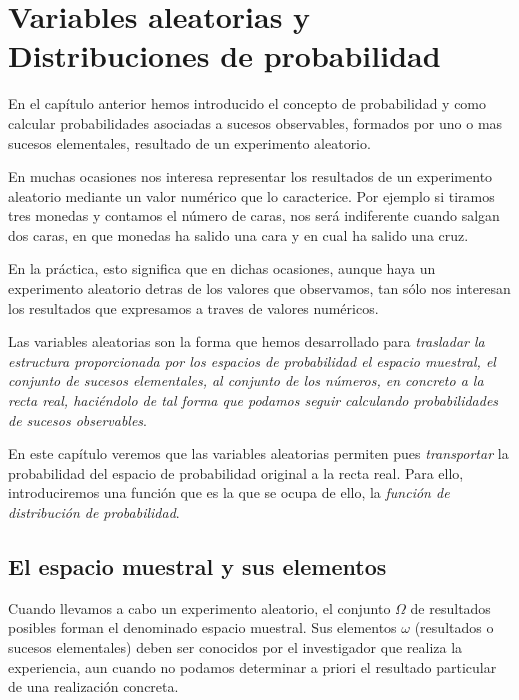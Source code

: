 \documentclass[
]{article}
\begin{document}
\newpage

\section{Variables aleatorias y Distribuciones de probabilidad}\label{variables-aleatorias-y-distribuciones-de-probabilidad}

En el capítulo anterior hemos introducido el concepto de probabilidad y
como calcular probabilidades asociadas a sucesos observables, formados
por uno o mas sucesos elementales, resultado de un experimento
aleatorio.

En muchas ocasiones nos interesa representar los resultados de un
experimento aleatorio mediante un valor numérico que lo caracterice. Por
ejemplo si tiramos tres monedas y contamos el número de caras, nos será
indiferente cuando salgan dos caras, en que monedas ha salido una cara y
en cual ha salido una cruz.

En la práctica, esto significa que en dichas ocasiones, aunque haya un
experimento aleatorio detras de los valores que observamos, tan sólo nos
interesan los resultados que expresamos a traves de valores numéricos.

Las variables aleatorias son la forma que hemos desarrollado para
\emph{trasladar la estructura proporcionada por los espacios de probabilidad
el espacio muestral, el conjunto de sucesos elementales, al conjunto de
los números, en concreto a la recta real, haciéndolo de tal forma que
podamos seguir calculando probabilidades de sucesos observables}.

En este capítulo veremos que las variables aleatorias permiten pues
\emph{transportar} la probabilidad del espacio de probabilidad original a la
recta real. Para ello, introduciremos una función que es la que se ocupa
de ello, la \emph{función de distribución de probabilidad}.

\subsection{El espacio muestral y sus elementos}\label{el-espacio-muestral-y-sus-elementos}

Cuando llevamos a cabo un experimento aleatorio, el conjunto \(\Omega\) de
resultados posibles forman el denominado espacio muestral. Sus elementos
\(\omega\) (resultados o sucesos elementales) deben ser conocidos por el
investigador que realiza la experiencia, aun cuando no podamos
determinar a priori el resultado particular de una realización concreta.
\end{document}
